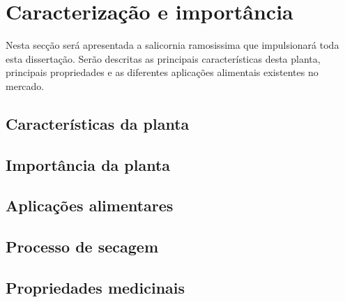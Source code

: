 
\chapter{Caracterização e importância}


Nesta secção será apresentada a salicornia ramosissima que impulsionará toda esta dissertação. Serão descritas as principais características desta planta, principais propriedades e as diferentes aplicações alimentais existentes no mercado. 

\section{Características da planta}



\cite{Toz}
\cite{Jose12}
\cite{Z}

\section{Importância da planta}


\section{Aplicações alimentares}

\section{Processo de secagem}

\section{Propriedades medicinais}











